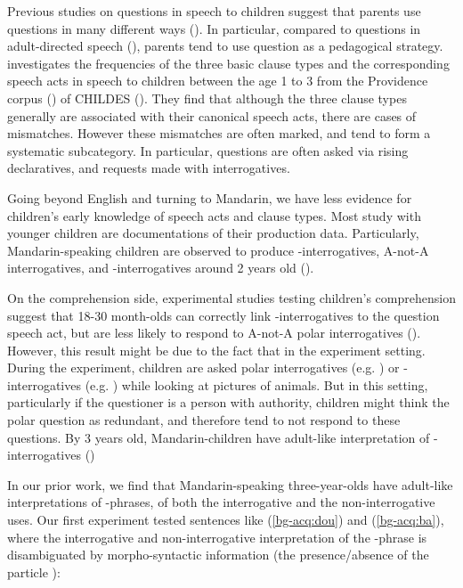 Previous studies on questions in speech to children suggest that parents use questions in many different ways (\citealt{holzman1972, shatz1979, tamir1980, yu2019pedagogical}). In particular, compared to questions in adult-directed speech (\citealt{stivers2010}), parents tend to use question as a pedagogical strategy. \citealt{zaitsu2020} investigates the frequencies of the three basic clause types and the corresponding speech acts in speech to children between the age 1 to 3 from the Providence corpus (\citealt{ProvidenceCorpus}) of CHILDES (\citealt{CHILDES}). They find that although the three clause types generally are associated with their canonical speech acts, there are cases of mismatches. However these mismatches are often marked, and tend to form a systematic subcategory. In particular, questions are often asked via rising declaratives, and requests made with interrogatives. 



Going beyond English and turning to Mandarin, we have less evidence for children's early knowledge of speech acts and clause types. Most study with younger children are documentations of their production data. Particularly, Mandarin-speaking children are observed to produce \ma-interrogatives, A-not-A interrogatives, and \twh-interrogatives around 2 years old (\citealt{miao1986acq, miao1992, lee1989acq, litang1991int, lichen1997compprod, lichen1997comp, fan2012, lijingwong2017}). 

On the comprehension side, experimental studies testing children’s comprehension suggest that 18-30 month-olds can correctly link \twh-interrogatives to the question speech act, but are less likely to respond to A-not-A polar interrogatives (\textcite{moradlou2020}). However, this result might be due to the fact that in the experiment setting. During the experiment, children are asked polar interrogatives (e.g. ) or \twh-interrogatives (e.g. ) while looking at pictures of animals. But in this setting, particularly if the questioner is a person with authority, children might think the polar question as redundant, and therefore tend to not respond to these questions. By 3 years old, Mandarin-children have adult-like interpretation of \twh-interrogatives (\citealt{fahn2003acq})

In our prior work, we find that Mandarin-speaking three-year-olds have adult-like interpretations of \twh-phrases, of both the interrogative and the non-interrogative uses. Our first experiment tested sentences like (\ref{bg-acq:dou}) and (\ref{bg-acq:ba}), where the interrogative and non-interrogative interpretation of the \twh-phrase is disambiguated by morpho-syntactic information (the presence/absence of the particle \dou{}):

